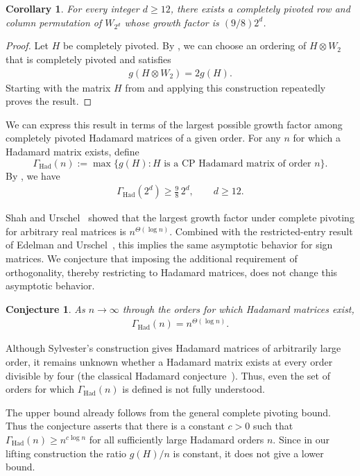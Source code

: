 \documentclass{article}
\newtheorem{corollary}{Corollary}
\newtheorem{conjecture}{Conjecture}
\begin{document}
\begin{corollary}\label{cor:family}
For every integer $d\ge12$, there exists a completely pivoted row and column
permutation of $W_{2^d}$ whose growth factor is $(9/8)2^d$.
\end{corollary}

\begin{proof}
Let $H$ be completely pivoted. By , we can choose an ordering
of $H\otimes W_2$ that is completely pivoted and satisfies
\begin{align*}
    g(H\otimes W_2)=2g(H).
\end{align*}
Starting with the matrix $H$ from  and applying this construction
repeatedly proves the result.
\end{proof}

We can express this result in terms of the largest possible growth factor
among completely pivoted Hadamard matrices of a given order. For any $n$ for
which a Hadamard matrix exists, define
\[
    \Gamma_{\mathrm{Had}}(n)
    :=\max\{g(H):H\text{ is a CP Hadamard matrix of order }n\}.
\]
By ,
we have
\begin{align*}
    \Gamma_{\mathrm{Had}}(2^d)\ge\frac98\,2^d,\qquad d\ge12.
\end{align*}

Shah and Urschel~\cite{SU} showed that the largest growth factor under
complete pivoting for arbitrary real matrices is $n^{\Theta(\log n)}$. Combined with the restricted-entry result of Edelman and Urschel~\cite[Theorem~3.3]{EU}, this implies the same asymptotic behavior for sign matrices. We conjecture that imposing the additional requirement of orthogonality, thereby restricting to Hadamard matrices, does not change this asymptotic behavior.

\begin{conjecture}\label{conj:asymptotic}
As $n\to\infty$ through the orders for which Hadamard matrices exist,
\begin{align*}
    \Gamma_{\mathrm{Had}}(n)=n^{\Theta(\log n)}.
\end{align*}
\end{conjecture}
Although Sylvester's construction gives Hadamard matrices of arbitrarily large order, it remains unknown whether a Hadamard matrix exists at every order divisible by four (the classical Hadamard conjecture~\cite{HW}). Thus, even the set of orders for which $\Gamma_{\text{Had}}(n)$ is defined is not fully understood.

The upper bound already follows from the general complete pivoting bound.
Thus the conjecture asserts that there is a constant $c>0$ such that
$\Gamma_{\mathrm{Had}}(n)\ge n^{c\log n}$ for all sufficiently large Hadamard
orders $n$. Since in our lifting construction the ratio $g(H)/n$ is constant, it does not give a lower bound.
\end{document}
